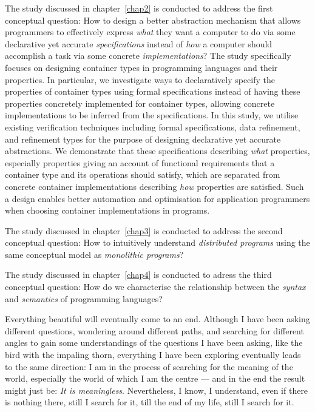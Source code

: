 The study discussed in chapter~\ref{chap2} is conducted to address the first conceptual question: How to design a better abstraction mechanism that allows programmers to effectively express \emph{what} they want a computer to do via some declarative yet accurate \emph{specifications} instead of \emph{how} a computer should accomplish a task via some concrete \emph{implementations}? The study specifically focuses on designing container types in programming languages and their properties. In particular, we investigate ways to declaratively specify the properties of container types using formal specifications instead of having these properties concretely implemented for container types, allowing concrete implementations to be inferred from the specifications. In this study, we utilise existing verification techniques including formal specifications, data refinement, and refinement types for the purpose of designing declarative yet accurate abstractions. We demonstrate that these specifications describing \emph{what} properties, especially properties giving an account of functional requirements that a container type and its operations should satisfy, which are separated from concrete container implementations describing \emph{how} properties are satisfied. Such a design enables better automation and optimisation for application programmers when choosing container implementations in programs.

The study discussed in chapter~\ref{chap3} is conducted to address the second conceptual question: How to intuitively understand \emph{distributed programs} using the same conceptual model as \emph{monolithic programs}?

The study discussed in chapter~\ref{chap4} is conducted to adress the third conceptual question: How do we characterise the relationship between the \emph{syntax} and \emph{semantics} of programming languages?

\begin{center}
\vspace{-0.7em}
\vspace{-0.3em}
\end{center}

Everything beautiful will eventually come to an end. Although I have been asking different questions, wondering around different paths, and searching for different angles to gain some understandings of the questions I have been asking, like the bird with the impaling thorn, everything I have been exploring eventually leads to the same direction: I am in the process of searching for the meaning of the world, especially the world of which I am the centre --- and in the end the result might just be: \emph{It is meaningless}. Nevertheless, I know, I understand, even if there is nothing there, still I search for it, till the end of my life, still I search for it.



